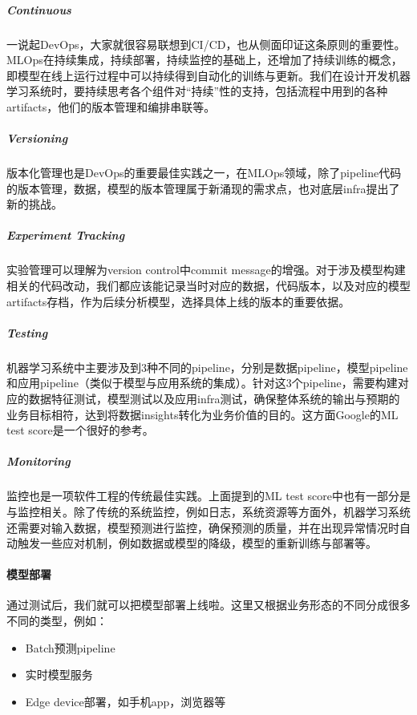 \documentclass[letterpaper,10pt,english]{sphinxmanual}
\begin{document}
\subparagraph{Continuous}
\label{\detokenize{chapter_AI_dive/MLOps:continuous}}
一说起DevOps，大家就很容易联想到CI/CD，也从侧面印证这条原则的重要性。MLOps在持续集成，持续部署，持续监控的基础上，还增加了持续训练的概念，即模型在线上运行过程中可以持续得到自动化的训练与更新。我们在设计开发机器学习系统时，要持续思考各个组件对“持续”性的支持，包括流程中用到的各种artifacts，他们的版本管理和编排串联等。


\subparagraph{Versioning}
\label{\detokenize{chapter_AI_dive/MLOps:versioning}}
版本化管理也是DevOps的重要最佳实践之一，在MLOps领域，除了pipeline代码的版本管理，数据，模型的版本管理属于新涌现的需求点，也对底层infra提出了新的挑战。


\subparagraph{Experiment Tracking}
\label{\detokenize{chapter_AI_dive/MLOps:experiment-tracking}}
实验管理可以理解为version control中commit
message的增强。对于涉及模型构建相关的代码改动，我们都应该能记录当时对应的数据，代码版本，以及对应的模型artifacts存档，作为后续分析模型，选择具体上线的版本的重要依据。


\subparagraph{Testing}
\label{\detokenize{chapter_AI_dive/MLOps:testing}}
机器学习系统中主要涉及到3种不同的pipeline，分别是数据pipeline，模型pipeline和应用pipeline（类似于模型与应用系统的集成）。针对这3个pipeline，需要构建对应的数据特征测试，模型测试以及应用infra测试，确保整体系统的输出与预期的业务目标相符，达到将数据insights转化为业务价值的目的。这方面Google的ML
test score是一个很好的参考。


\subparagraph{Monitoring}
\label{\detokenize{chapter_AI_dive/MLOps:monitoring}}
监控也是一项软件工程的传统最佳实践。上面提到的ML test
score中也有一部分是与监控相关。除了传统的系统监控，例如日志，系统资源等方面外，机器学习系统还需要对输入数据，模型预测进行监控，确保预测的质量，并在出现异常情况时自动触发一些应对机制，例如数据或模型的降级，模型的重新训练与部署等。


\paragraph{模型部署}
\label{\detokenize{chapter_AI_dive/MLOps:id3}}
通过测试后，我们就可以把模型部署上线啦。这里又根据业务形态的不同分成很多不同的类型，例如：
\begin{itemize}
\item {} 
Batch预测pipeline

\item {} 
实时模型服务

\item {} 
Edge device部署，如手机app，浏览器等

\end{itemize}
\end{document}
